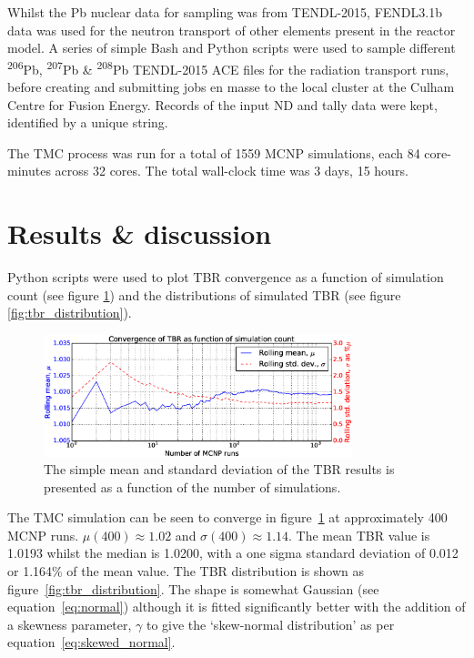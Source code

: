 Whilst the Pb nuclear data for sampling was from TENDL-2015, FENDL3.1b data was used for the neutron transport of other elements present in the reactor model. A series of simple Bash and Python scripts were used to sample different \textsuperscript{206}Pb, \textsuperscript{207}Pb \& \textsuperscript{208}Pb TENDL-2015 ACE files for the radiation transport runs, before creating and submitting jobs en masse to the local cluster at the Culham Centre for Fusion Energy. Records of the input ND and tally data were kept, identified by a unique string.

The TMC process was run for a total of 1559 MCNP simulations, each 84 core-minutes across 32 cores. The total wall-clock time was 3 days, 15 hours.

\section{Results \& discussion}
Python scripts were used to plot TBR convergence as a function of simulation count (see figure \ref{fig:convergence}) and the distributions of simulated TBR (see figure \ref{fig:tbr_distribution}).

\begin{figure}[H]
	\includegraphics[width=0.8\textwidth]{hcll_convergence_1559}
	\caption{The simple mean and standard deviation of the TBR results is presented as a function of the number of simulations.}
	\label{fig:convergence}
\end{figure}

The TMC simulation can be seen to converge in figure~\ref{fig:convergence} at approximately 400 MCNP runs. $\mu(400) \approx 1.02$ and $\sigma(400) \approx 1.14$. The mean TBR value is 1.0193 whilst the median is 1.0200, with a one sigma standard deviation of 0.012 or 1.164\% of the mean value. The TBR distribution is shown as figure~\ref{fig:tbr_distribution}. The shape is somewhat Gaussian (see equation~\ref{eq:normal}) although it is fitted significantly better with the addition of a skewness parameter, $\gamma$ to give the `skew-normal distribution' as per equation~\ref{eq:skewed_normal}. 

